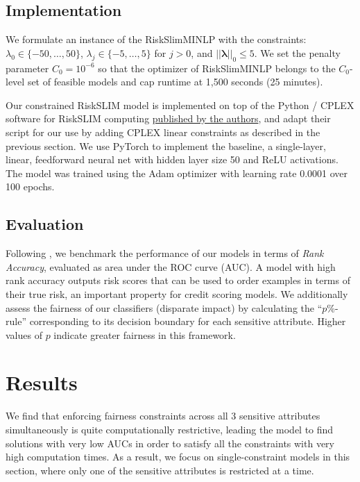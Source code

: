 \documentclass[11pt, margin=1in]{article}
\newcommand{\vect}[1]{\boldsymbol{#1}}
\begin{document}
\subsection{Implementation}

We formulate an instance of the RiskSlimMINLP with the constraints: $\lambda_0 \in \{-50, \dots, 50\}$, $\lambda_j \in \{-5, \dots, 5\}$ for $j > 0$, and $\vert\vert\vect{\lambda}\vert\vert_0\leq 5$. We set the penalty parameter $C_0=10^{-6}$ so that the optimizer of RiskSlimMINLP belongs to the $C_0$-level set of feasible models and cap runtime at 1,500 seconds (25 minutes).

Our constrained RiskSLIM model is implemented on top of the Python / CPLEX software for RiskSLIM computing \href{https://github.com/ustunb/risk-slim}{published by the authors}, and adapt their script for our use by adding CPLEX linear constraints as described in the previous section. We use PyTorch to implement the baseline, a single-layer, linear, feedforward neural net with hidden layer size 50 and ReLU activations. The model was trained using the Adam optimizer with learning rate 0.0001 over 100 epochs. 

\subsection{Evaluation}

Following \cite{risk-slim}, we benchmark the performance of our models in terms of \textit{Rank Accuracy}, evaluated as area under the ROC curve (AUC). A model with high rank accuracy outputs risk scores that can be used to order examples in terms of their true risk, an important property for credit scoring models. We additionally assess the fairness of our classifiers (disparate impact) by calculating the ``$p$\%-rule'' corresponding to its decision boundary for each sensitive attribute. Higher values of $p$ indicate greater fairness in this framework.


\section{Results} \label{sec:results}

We find that enforcing fairness constraints across all 3 sensitive attributes simultaneously is quite computationally restrictive, leading the model to find solutions with very low AUCs in order to satisfy all the constraints with very high computation times. As a result, we focus on single-constraint models in this section, where only one of the sensitive attributes is restricted at a time.
\end{document}
